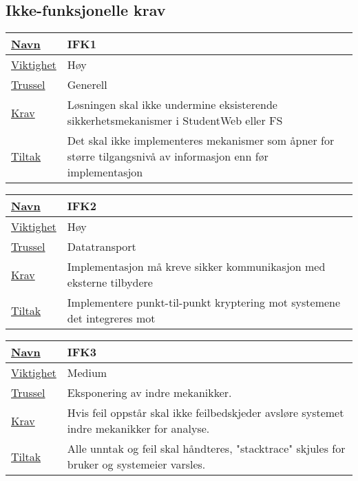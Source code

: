 \subsection{Ikke-funksjonelle krav}

\begin{tabularx}{\textwidth}{|l|X|}
  \hline
  \underline{Navn} & IFK1 \\ \hline
  \underline{Viktighet} & Høy \\ \hline
  \underline{Trussel} & Generell \\ \hline
  \underline{Krav} & Løsningen skal ikke undermine eksisterende sikkerhetsmekanismer i StudentWeb eller FS \\ \hline
  \underline{Tiltak} & Det skal ikke implementeres mekanismer som åpner for større tilgangsnivå av informasjon enn før implementasjon \\ \hline
\end{tabularx}

\vfill

\begin{tabularx}{\textwidth}{|l|X|}
  \hline
  \underline{Navn} & IFK2 \\ \hline
  \underline{Viktighet} & Høy \\ \hline
  \underline{Trussel} & Datatransport \\ \hline
  \underline{Krav} & Implementasjon må kreve sikker kommunikasjon med eksterne tilbydere \\ \hline
  \underline{Tiltak} & Implementere punkt-til-punkt kryptering mot systemene det integreres mot \\ \hline
\end{tabularx}

\vfill

\begin{tabularx}{\textwidth}{|l|X|}
  \hline
  \underline{Navn} & IFK3 \\ \hline
  \underline{Viktighet} & Medium \\ \hline
  \underline{Trussel} & Eksponering av indre mekanikker. \\ \hline
  \underline{Krav} & Hvis feil oppstår skal ikke feilbedskjeder avsløre systemet indre mekanikker for analyse. \\ \hline
  \underline{Tiltak} & Alle unntak og feil skal håndteres, "stacktrace" skjules for bruker og systemeier varsles. \\ \hline
\end{tabularx}

\vfill

